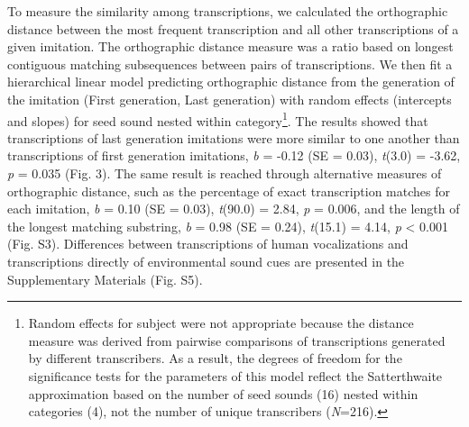 \documentclass[english,floatsintext,man]{apa6}
\theoremstyle{definition}
\theoremstyle{definition}
\theoremstyle{definition}
\theoremstyle{remark}
\begin{document}
To measure the similarity among transcriptions, we calculated the
orthographic distance between the most frequent transcription and all
other transcriptions of a given imitation. The orthographic distance
measure was a ratio based on longest contiguous matching subsequences
between pairs of transcriptions. We then fit a hierarchical linear model
predicting orthographic distance from the generation of the imitation
(First generation, Last generation) with random effects (intercepts and
slopes) for seed sound nested within category\footnote{Random effects
  for subject were not appropriate because the distance measure was
  derived from pairwise comparisons of transcriptions generated by
  different transcribers. As a result, the degrees of freedom for the
  significance tests for the parameters of this model reflect the
  Satterthwaite approximation based on the number of seed sounds (16)
  nested within categories (4), not the number of unique transcribers
  (\emph{N}=216).}. The results showed that transcriptions of last
generation imitations were more similar to one another than
transcriptions of first generation imitations, \emph{b} = -0.12 (SE =
0.03), \emph{t}(3.0) = -3.62, \emph{p} = 0.035 (Fig. 3). The same result
is reached through alternative measures of orthographic distance, such
as the percentage of exact transcription matches for each imitation,
\emph{b} = 0.10 (SE = 0.03), \emph{t}(90.0) = 2.84, \emph{p} = 0.006,
and the length of the longest matching substring, \emph{b} = 0.98 (SE =
0.24), \emph{t}(15.1) = 4.14, \emph{p} \textless{} 0.001 (Fig. S3).
Differences between transcriptions of human vocalizations and
transcriptions directly of environmental sound cues are presented in the
Supplementary Materials (Fig. S5).
\end{document}
